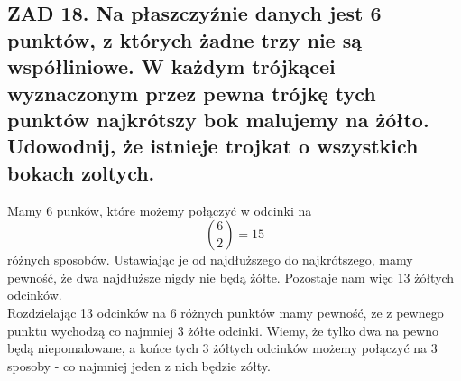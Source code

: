 \documentclass{article}
\begin{document}
\subsection*{ZAD 18. Na płaszczyźnie danych jest 6 punktów, z których żadne trzy nie są współliniowe. W każdym trójkącei wyznaczonym przez pewna trójkę tych punktów najkrótszy bok malujemy na żółto. Udowodnij, że istnieje trojkat o wszystkich bokach zoltych.}
  Mamy 6 punków, które możemy połączyć w odcinki na
  $${6\choose2}=15$$
  różnych sposobów. Ustawiając je od najdłuższego do najkrótszego, mamy pewność, że dwa najdłuższe nigdy nie będą żółte. Pozostaje nam więc 13 żółtych odcinków.\\
  Rozdzielając 13 odcinków na 6 różnych punktów mamy pewność, ze z pewnego punktu wychodzą co najmniej 3 żółte odcinki. Wiemy, że tylko dwa na pewno będą niepomalowane, a końce tych 3 żółtych odcinków możemy połączyć na 3 sposoby - co najmniej jeden z nich będzie zółty.
  \begin{center}
  \end{center}
  \newpage
\end{document}
